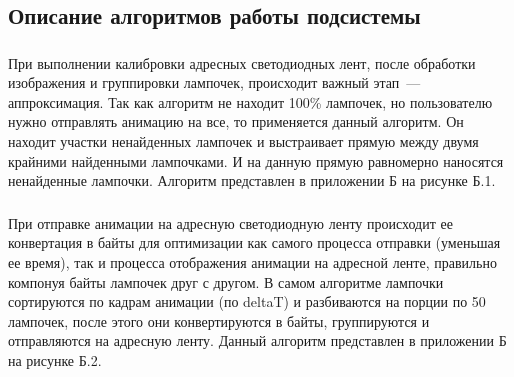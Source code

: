 \subsection{Описание алгоритмов работы подсистемы}
\label{sec:develop:algorithms}

\label{sec:develop:algorithms:approximation}
\subsubsection{}    При выполнении калибровки адресных светодиодных лент, после обработки изображения и группировки лампочек, происходит важный этап~--- аппроксимация. Так как алгоритм не находит 100\% лампочек, но пользователю нужно отправлять анимацию на все, то применяется данный алгоритм. Он находит участки ненайденных лампочек и выстраивает прямую между двумя крайними найденными лампочками. И на данную прямую равномерно наносятся ненайденные лампочки. Алгоритм представлен в приложении Б на рисунке Б.1.

\label{sec:develop:algorithms:bytesSending}
\subsubsection{}    При отправке анимации на адресную светодиодную ленту происходит ее конвертация в байты для оптимизации как самого процесса отправки (уменьшая ее время), так и процесса отображения анимации на адресной ленте, правильно компонуя байты лампочек друг с другом. В самом алгоритме лампочки сортируются по кадрам анимации (по deltaT) и разбиваются на порции по 50 лампочек, после этого они конвертируются в байты, группируются и отправляются на адресную ленту. Данный алгоритм представлен в приложении Б на рисунке Б.2.